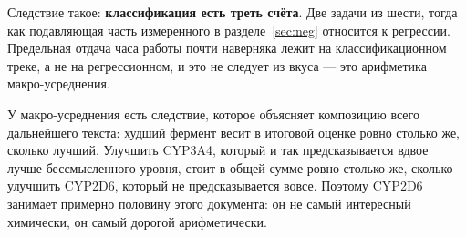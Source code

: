 Следствие такое: \textbf{классификация есть треть счёта}. Две задачи из шести, тогда как
подавляющая часть измеренного в разделе~\ref{sec:neg} относится к регрессии. Предельная отдача
часа работы почти наверняка лежит на классификационном треке, а не на регрессионном, и это не
следует из вкуса --- это арифметика макро-усреднения.

У макро-усреднения есть следствие, которое объясняет композицию всего дальнейшего текста:
худший фермент весит в итоговой оценке ровно столько же, сколько лучший. Улучшить CYP3A4,
который и так предсказывается вдвое лучше бессмысленного уровня, стоит в общей сумме ровно
столько же, сколько улучшить CYP2D6, который не предсказывается вовсе. Поэтому CYP2D6
занимает примерно половину этого документа: он не самый интересный химически, он самый
дорогой арифметически.
